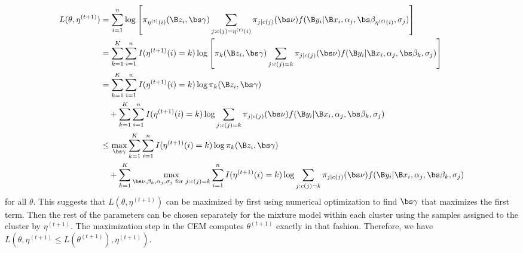        \begin{align*}
 L(\theta,\eta^{(t+1)})  &= \sum^{n}_{i=1}\log\left[\pi_{\eta^{(t)}(i)}(\B z_{i},\bs \gamma)\sum_{j:c(j)=\eta^{(t)}(i)}\pi_{j|c(j)}(\bs\nu)f(\B y_{i}|\B x_{i},\alpha_{j},\bs\beta_{\eta^{(t)}(i)},\sigma_{j})\right]\\
 &= \sum^{K}_{k=1}\sum^{n}_{i=1}I(\eta^{(t+1)}(i) = k)\log\left[\pi_{k}(\B z_{i},\bs \gamma)\sum_{j:c(j)=k}\pi_{j|c(j)}(\bs\nu)f(\B y_{i}|\B x_{i},\alpha_{j},\bs\beta_{k},\sigma_{j})\right]\\
  &= \sum^{K}_{k=1}\sum^{n}_{i=1}I(\eta^{(t+1)}(i) = k)\log\pi_{k}(\B z_{i},\bs \gamma)\\
  &\quad+\sum^{K}_{k=1}\sum^{n}_{i=1}I(\eta^{(t+1)}(i) = k)\log \sum_{j:c(j)=k}\pi_{j|c(j)}(\bs\nu)f(\B y_{i}|\B x_{i},\alpha_{j},\bs\beta_{k},\sigma_{j})\\
    &\leq\max_{\bs\gamma} \sum^{K}_{k=1}\sum^{n}_{i=1}I(\eta^{(t+1)}(i) = k)\log\pi_{k}(\B z_{i},\bs \gamma)\\
  &\quad+\sum^{K}_{k=1}\max_{\bs \nu,\beta_{k},\alpha_{j},\sigma_{j}\text{ for }j:c(j)=k}\sum^{n}_{i=1}I(\eta^{(t+1)}(i) = k)\log \sum_{j:c(j)=k}\pi_{j|c(j)}(\bs\nu)f(\B y_{i}|\B x_{i},\alpha_{j},\bs\beta_{k},\sigma_{j})\\
    \end{align*}
    for all $\theta$. This suggests that $L(\theta,\eta^{(t+1)})$ can be maximized by first using numerical optimization to find $\bs\gamma$ that maximizes the first term. Then the rest of the parameters can be chosen separately for the mixture model within each cluster using the samples assigned to the cluster by $\eta^{(t+1)}$. The maximization step in the CEM computes $\theta^{(t+1)}$ exactly in that fashion. Therefore, we have $L(\theta,\eta^{(t+1)}\leq L(\theta^{(t+1)}),\eta^{(t+1)})$. 